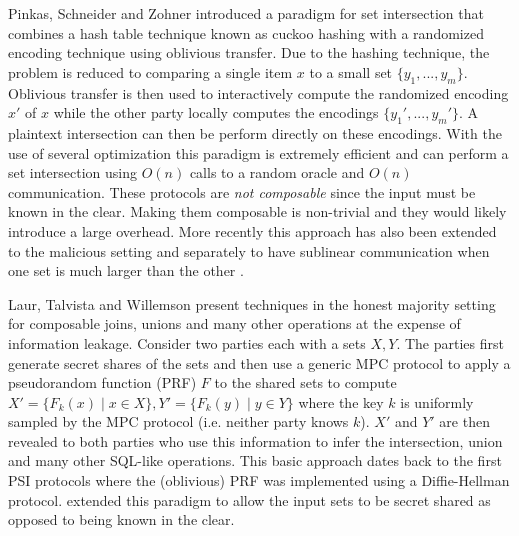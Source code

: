 \documentclass[11pt,letterpaper]{article}
\begin{document}
Pinkas, Schneider and Zohner \cite{usenix:PSZ14} introduced a paradigm for set intersection that combines a hash table technique known as cuckoo hashing with a randomized encoding technique using oblivious transfer. Due to the hashing technique, the problem is reduced to comparing a single item $x$ to a small set $\{y_1,...,y_m\}$. Oblivious transfer is then used to interactively compute the randomized encoding $x'$ of $x$ while the other party locally computes the encodings $\{ y_1',..., y_m' \}$. A plaintext intersection can then be perform directly on these encodings. With the use of several optimization\cite{USENIX:PSSZ15,PSZ16,CCS:KKRT16,OOS17} this paradigm is extremely efficient and can perform a set intersection using $O(n)$ calls to a random oracle and $O(n)$ communication. These protocols are \emph{not composable} since the input must be known in the clear. Making them composable is non-trivial and they would likely introduce a large overhead.
\iffullversion
More recently this approach has also been extended to the malicious setting \cite{CCS:RinRos17} and separately to have sublinear communication when one set is much larger than the other\cite{CLR17} .
\fi


Laur, Talvista and Willemson\cite{LTW13} present techniques in the honest majority setting for composable joins, unions and  many other operations at the expense of information leakage. Consider two parties each with a sets $X,Y$. The parties first generate secret shares of the sets and then use a generic MPC protocol to apply a pseudorandom function (PRF) $F$ to the shared sets to compute $X' = \{F_k(x) \mid x\in X\}, Y'=\{F_k(y) \mid y\in Y\}$ where the key $k$ is uniformly sampled by the MPC protocol (i.e. neither party knows $k$). $X'$ and $Y'$ are then revealed to both parties who use this information to infer the intersection, union and many other SQL-like operations. This basic approach dates back to the first PSI protocols \cite{Mea86,HFH99} where the (oblivious) PRF was implemented using a Diffie-Hellman protocol. \cite{LTW13} extended this paradigm to allow the input sets to be secret shared as opposed to being known in the clear.
\end{document}

